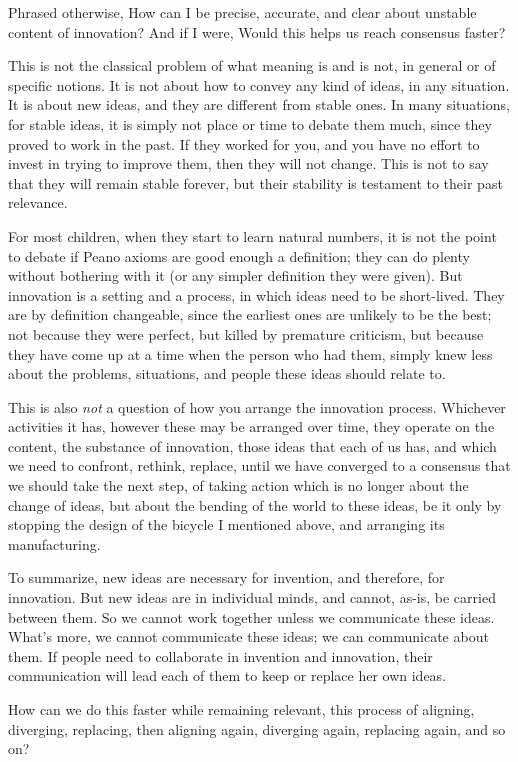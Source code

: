 Phrased otherwise, How can I be precise, accurate, and clear about unstable content of innovation? And if I were, Would this helps us reach consensus faster?

This is not the classical problem of what meaning is and is not, in general or of specific notions. It is not about how to convey any kind of ideas, in any situation. It is about new ideas, and they are different from stable ones. In many situations, for stable ideas, it is simply not place or time to debate them much, since they proved to work in the past. If they worked for you, and you have no effort to invest in trying to improve them, then they will not change. This is not to say that they will remain stable forever, but their stability is testament to their past relevance. 

For most children, when they start to learn natural numbers, it is not the point to debate if Peano axioms are good enough a definition; they can do plenty without bothering with it (or any simpler definition they were given). But innovation is a setting and a process, in which ideas need to be short-lived. They are by definition changeable, since the earliest ones are unlikely to be the best; not because they were perfect, but killed by premature criticism, but because they have come up at a time when the person who had them, simply knew less about the problems, situations, and people these ideas should relate to. 

This is also \textit{not} a question of how you arrange the innovation process. Whichever activities it has, however these may be arranged over time, they operate on the content, the substance of innovation, those ideas that each of us has, and which we need to confront, rethink, replace, until we have converged to a consensus that we should take the next step, of taking action which is no longer about the change of ideas, but about the bending of the world to these ideas, be it only by stopping the design of the bicycle I mentioned above, and arranging its manufacturing. 

To summarize, new ideas are necessary for invention, and therefore, for innovation. But new ideas are in individual minds, and cannot, as-is, be carried between them. So we cannot work together unless we communicate these ideas. What's more, we cannot communicate these ideas; we can communicate about them. If people need to collaborate in invention and innovation, their communication will lead each of them to keep or replace her own ideas. 

How can we do this faster while remaining relevant, this process of aligning, diverging, replacing, then aligning again, diverging again, replacing again, and so on? 

